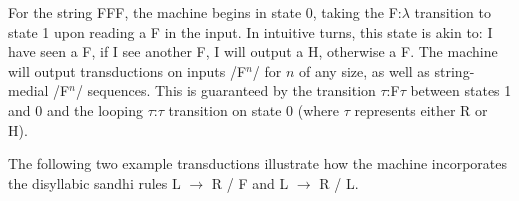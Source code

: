 \documentclass{article}
\begin{document}
For the string FFF, the machine begins in state 0, taking the F:$\lambda$ transition to state 1 upon reading a F in the input. In intuitive turns, this state is akin to: I have seen a F, if I see another F, I will output a H, otherwise a F. The machine will output transductions on inputs /F$^n$/ for $n$ of any size, as well as string-medial /F$^n$/ sequences. This is guaranteed by the transition $\tau$:F$\tau$ between states 1 and 0 and the looping $\tau$:$\tau$ transition on state 0 (where $\tau$ represents either R or H). \par
The following two example transductions illustrate how the machine incorporates the disyllabic sandhi rules L $\rightarrow$ R / \underline{\hspace{1em}} F and L $\rightarrow$ R / \underline{\hspace{1em}} L.
\begin{exe}
\ex \label{LFF}
\end{exe}
\begin{exe}
\ex \label{LLF}
\end{exe}
\begin{exe}
\ex \label{LLL}
\end{exe}
\end{document}
